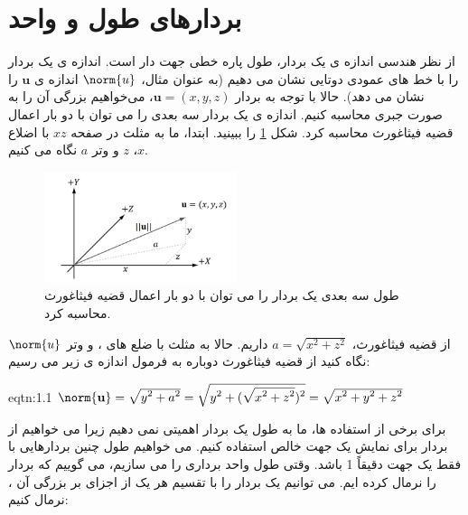 \section{\textbf{بردارهای طول و واحد}}
{
    \Large
    \begin{spacing}{1.5}
        از نظر هندسی اندازه ی یک بردار، طول پاره خطی جهت دار است.
        اندازه ی یک بردار را با خط های عمودی دوتایی نشان می دهیم
        (به عنوان مثال، $\norm{u}$ اندازه ی $\textbf{u}$ را نشان می دهد).
        حالا با توجه به بردار $\textbf{u}=(x,y,z)$، می‌خواهیم بزرگی آن را به صورت جبری محاسبه کنیم.
        اندازه ی یک بردار سه بعدی را می توان با دو بار اعمال قضیه فیثاغورث محاسبه کرد.
        شکل \ref{fig:4.Session.1.1.8} را ببینید. ابتدا، ما به مثلث در صفحه $xz$ با اضلاع $x$، $z$ و وتر $a$ نگاه می کنیم.

        \begin{figure}[H]
            \centering
            \setlength{\belowcaptionskip}{-10pt}
            \includegraphics[width=0.5\textwidth]{Images/4/1/4.Session.1.1.8}
            \caption{طول سه بعدی یک بردار را می توان با دو بار اعمال قضیه فیثاغورث محاسبه کرد.}
            \label{fig:4.Session.1.1.8}
        \end{figure}

        از قضیه فیثاغورث، $a=\sqrt{\displaystyle x^2+z^2}$ داریم.
        حالا به مثلث با ضلع های ،  و وتر $\norm{u}$ نگاه کنید از قضیه فیثاغورث دوباره به فرمول اندازه ی زیر می رسیم:

        \begin{eqtn}{eqtn:1.1}
            \centering
            $\norm{\textbf{u}}=\sqrt{\displaystyle y^2+a^2}=\sqrt{\displaystyle y^2+(\sqrt{\displaystyle x^2+z^2})^2}=\sqrt{\displaystyle x^2+y^2+z^2}$
        \end{eqtn}

        برای برخی از استفاده ها، ما به طول یک بردار اهمیتی نمی دهیم زیرا می خواهیم از بردار برای نمایش یک جهت خالص استفاده کنیم.
        می خواهیم طول چنین بردارهایی با فقط یک جهت دقیقاً 1 باشد.
        وقتی طول واحد برداری را می سازیم، می گوییم که بردار را نرمال کرده ایم.
        می توانیم یک بردار را با تقسیم هر یک از اجزای بر بزرگی آن ، نرمال کنیم:


\end{spacing}}
